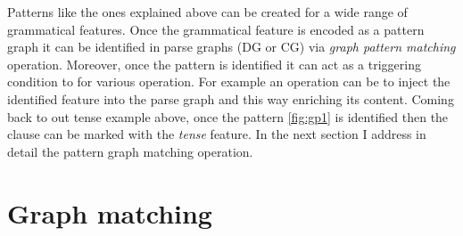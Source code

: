%
%


Patterns like the ones explained above can be created for a wide range of grammatical features. Once the grammatical feature is encoded as a pattern graph it can be identified in parse graphs (DG or CG) via \textit{graph pattern matching} operation. Moreover, once the pattern is identified it can act as a triggering condition to for various operation. For example an operation can be to inject the identified feature into the parse graph and this way enriching its content. Coming back to out tense example above, once the pattern \ref{fig:gp1} is identified then the clause can be marked with the \textit{tense} feature. In the next section I address in detail the pattern graph matching operation. 


\section{Graph matching}
\label{sec:graph-matching}

